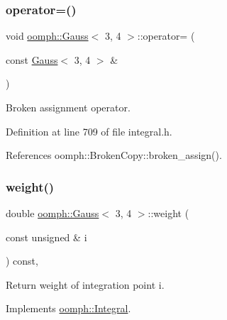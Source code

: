 \mbox{\label{classoomph_1_1Gauss_3_013_00_014_01_4_a5ecdf079d05bf4b964bb8dca630b9315}} 
\subsubsection{\texorpdfstring{operator=()}{operator=()}}
{\footnotesize\ttfamily void \hyperlink{classoomph_1_1Gauss}{oomph\+::\+Gauss}$<$ 3, 4 $>$\+::operator= (\begin{DoxyParamCaption}\item[{const \hyperlink{classoomph_1_1Gauss}{Gauss}$<$ 3, 4 $>$ \&}]{ }\end{DoxyParamCaption})\hspace{0.3cm}{\ttfamily [inline]}}



Broken assignment operator. 



Definition at line 709 of file integral.\+h.



References oomph\+::\+Broken\+Copy\+::broken\+\_\+assign().

\mbox{\label{classoomph_1_1Gauss_3_013_00_014_01_4_ad9c664d8725923be151bf05c4c16d9e2}} 
\subsubsection{\texorpdfstring{weight()}{weight()}}
{\footnotesize\ttfamily double \hyperlink{classoomph_1_1Gauss}{oomph\+::\+Gauss}$<$ 3, 4 $>$\+::weight (\begin{DoxyParamCaption}\item[{const unsigned \&}]{i }\end{DoxyParamCaption}) const\hspace{0.3cm}{\ttfamily [inline]}, {\ttfamily [virtual]}}



Return weight of integration point i. 



Implements \hyperlink{classoomph_1_1Integral_ac65335e2aab120b285b3d6c294507b06}{oomph\+::\+Integral}.



